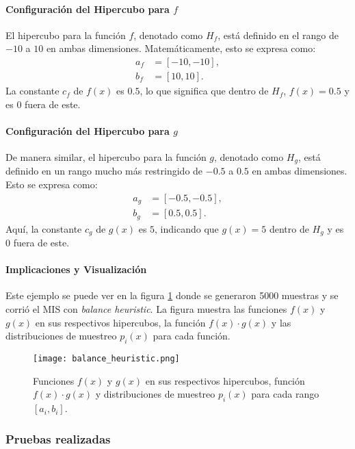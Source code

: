 \documentclass{article}
\begin{document}
\paragraph{Configuración del Hipercubo para \( f \)}
El hipercubo para la función \( f \), denotado como \( H_f \), está definido en el rango de \(-10\) a \(10\) en ambas dimensiones. Matemáticamente, esto se expresa como:
\begin{align*}
    a_f &= [-10, -10], \\
    b_f &= [10, 10].
\end{align*}
La constante \( c_f \) de \( f(x) \) es \( 0.5 \), lo que significa que dentro de \( H_f \), \( f(x) = 0.5 \) y es \( 0 \) fuera de este.

\paragraph{Configuración del Hipercubo para \( g \)}
De manera similar, el hipercubo para la función \( g \), denotado como \( H_g \), está definido en un rango mucho más restringido de \(-0.5\) a \(0.5\) en ambas dimensiones. Esto se expresa como:
\begin{align*}
    a_g &= [-0.5, -0.5], \\
    b_g &= [0.5, 0.5].
\end{align*}
Aquí, la constante \( c_g \) de \( g(x) \) es \( 5 \), indicando que \( g(x) = 5 \) dentro de \( H_g \) y es \( 0 \) fuera de este.

\paragraph{Implicaciones y Visualización}
Este ejemplo se puede ver en la figura \ref{fig:mis3} donde se generaron 5000 muestras y se corrió el MIS con \textit{balance heuristic}.
La figura muestra las funciones \( f(x) \) y \( g(x) \) en sus respectivos hipercubos, la función \( f(x) \cdot g(x) \) y las distribuciones de muestreo \( p_{i}(x) \) para cada función.

\begin{figure}[H]
\texttt{[image: balance\_heuristic.png]}
\caption{Funciones \( f(x) \) y \( g(x) \) en sus respectivos hipercubos, función \( f(x) \cdot g(x) \) y distribuciones de muestreo \( p_{i}(x) \) para cada rango \( [a_{i}, b_{i}] \).}
\label{fig:mis3}
\end{figure}

\subsubsection{Pruebas realizadas}
\end{document}
